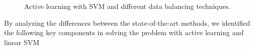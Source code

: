 \documentclass{svjour3}
\theoremstyle{break}
\begin{document}
\begin{figure}[!t]
    \centering
    \caption{Active learning with SVM and different data balancing techniques.}
    \label{fig:SVM}
\end{figure}

By analyzing the differences between the state-of-the-art methods, we identified the following key components in solving the problem with active learning and linear SVM
\end{document}
